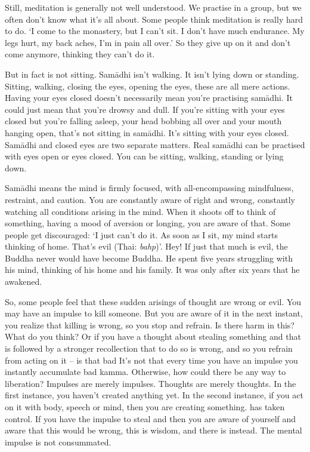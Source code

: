 Still, meditation is generally not well understood. We practise in a group, but we often don't know what it's all about. Some people think meditation is really hard to do. `I come to the monastery, but I can't sit. I don't have much endurance. My legs hurt, my back aches, I'm in pain all over.' So they give up on it and don't come anymore, thinking they can't do it.

But in fact  is not sitting. Sam\=adhi isn't walking. It isn't lying down or standing. Sitting, walking, closing the eyes, opening the eyes, these are all mere actions. Having your eyes closed doesn't necessarily mean you're practising sam\=adhi. It could just mean that you're drowsy and dull. If you're sitting with your eyes closed but you're falling asleep, your head bobbing all over and your mouth hanging open, that's not sitting in sam\=adhi. It's sitting with your eyes closed. Sam\=adhi and closed eyes are two separate matters. Real sam\=adhi can be practised with eyes open or eyes closed. You can be sitting, walking, standing or lying down.

Sam\=adhi means the mind is firmly focused, with all-encompassing mindfulness, restraint, and caution. You are constantly aware of right and wrong, constantly watching all conditions arising in the mind. When it shoots off to think of something, having a mood of aversion or longing, you are aware of that. Some people get discouraged: `I just can't do it. As soon as I sit, my mind starts thinking of home. That's evil (Thai: \textit{bahp})'. Hey! If just that much is evil, the Buddha never would have become Buddha. He spent five years struggling with his mind, thinking of his home and his family. It was only after six years that he awakened.

So, some people feel that these sudden arisings of thought are wrong or evil. You may have an impulse to kill someone. But you are aware of it in the next instant, you realize that killing is wrong, so you stop and refrain. Is there harm in this? What do you think? Or if you have a thought about stealing something and that is followed by a stronger recollection that to do so is wrong, and so you refrain from acting on it -- is that bad  It's not that every time you have an impulse you instantly accumulate bad kamma. Otherwise, how could there be any way to liberation? Impulses are merely impulses. Thoughts are merely thoughts. In the first instance, you haven't created anything yet. In the second instance, if you act on it with body, speech or mind, then you are creating something.  has taken control. If you have the impulse to steal and then you are aware of yourself and aware that this would be wrong, this is wisdom, and there is  instead. The mental impulse is not consummated.

